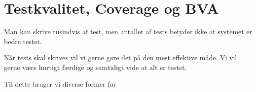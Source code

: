 \section{Testkvalitet, Coverage og BVA}

Man kan skrive tusindvis af test, men antallet af tests betyder ikke at systemet er bedre testet. 

Når tests skal skrives vil vi gerne gøre det på den mest effektive måde. Vi vil gerne være hurtigt færdige og samtidigt vide at alt er testet.

Til dette bruger vi diverse former for 